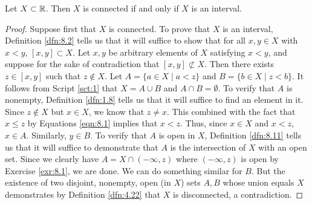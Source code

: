 \documentclass[../main.tex]{subfiles}
\begin{document}
\begin{theorem}\label{trm:8.15}
    Let $X\subset\mathbb{R}$. Then $X$ is connected if and only if $X$ is an interval.
    \begin{proof}
        Suppose first that $X$ is connected. To prove that $X$ is an interval, Definition \ref{dfn:8.2} tells us that it will suffice to show that for all $x,y\in X$ with $x<y$, $[x,y]\subset X$. Let $x,y$ be arbitrary elements of $X$ satisfying $x<y$, and suppose for the sake of contradiction that $[x,y]\not\subset X$. Then there exists $z\in[x,y]$ such that $z\notin X$. Let $A=\{a\in X\mid a<z\}$ and $B=\{b\in X\mid z<b\}$. It follows from Script \ref{sct:1} that $X=A\cup B$ and $A\cap B=\emptyset$. To verify that $A$ is nonempty, Definition \ref{dfn:1.8} tells us that it will suffice to find an element in it. Since $z\notin X$ but $x\in X$, we know that $z\neq x$. This combined with the fact that $x\leq z$ by Equations \ref{eqn:8.1} implies that $x<z$. Thus, since $x\in X$ and $x<z$, $x\in A$. Similarly, $y\in B$. To verify that $A$ is open in $X$, Definition \ref{dfn:8.11} tells us that it will suffice to demonstrate that $A$ is the intersection of $X$ with an open set. Since we clearly have $A=X\cap(-\infty,z)$ where $(-\infty,z)$ is open by Exercise \ref{exr:8.1}, we are done. We can do something similar for $B$. But the existence of two disjoint, nonempty, open (in $X$) sets $A,B$ whose union equals $X$ demonstrates by Definition \ref{dfn:4.22} that $X$ is disconnected, a contradiction.\par\medskip

\end{proof}
\end{theorem}
\end{document}
